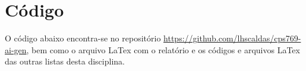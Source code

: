 \documentclass[12 pt]{article}
\begin{document}
\section*{Código}

O código abaixo encontra-se no repositório \href{https://github.com/lhscaldas/cps769-ai-gen}{https://github.com/lhscaldas/cps769-ai-gen}, bem como o arquivo LaTex com o relatório e os códigos e arquivos LaTex das outras listas desta disciplina.



\end{document}
